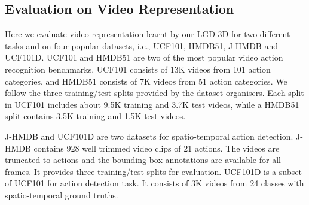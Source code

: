 \documentclass[10pt,twocolumn,letterpaper]{article}
\begin{document}
\subsection{Evaluation on Video Representation}
Here we evaluate video representation learnt by our LGD-3D for two different tasks and on four popular datasets, i.e., UCF101, HMDB51, J-HMDB and UCF101D. UCF101 \cite{UCF101} and HMDB51\cite{HMDB51} are two of the most popular video action recognition benchmarks. UCF101 consists of 13K videos from 101 action categories, and HMDB51 consists of 7K videos from 51 action categories. We follow the three training/test splits provided by the dataset organisers. Each split in UCF101 includes about 9.5K training and 3.7K test videos, while a HMDB51 split contains 3.5K training and 1.5K test videos.

J-HMDB and UCF101D are two datasets for spatio-temporal action detection. J-HMDB \cite{jhuang2013towards} contains 928 well trimmed video clips of 21 actions. The videos are truncated to actions and the bounding box annotations are available for all frames. It provides three training/test splits for evaluation. UCF101D \cite{UCF101} is a subset of UCF101 for action detection task. It consists of 3K videos from 24 classes with spatio-temporal ground truths.
\end{document}
